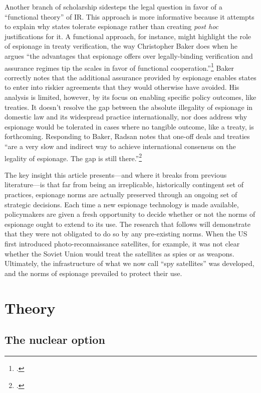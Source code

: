 \documentclass[12pt]{extarticle}
\begin{document}
Another branch of scholarship sidesteps the legal question in favor of a \enquote{functional theory} of IR. This approach is more informative because it attempts to explain why states tolerate espionage rather than creating \emph{post hoc} justifications for it. A functional approach, for instance, might highlight the role of espionage in treaty verification, the way Christopher Baker does when he argues \enquote{the advantages that espionage offers over legally-binding verification and assurance regimes tip the scales in favor of functional cooperation.}\footcite{baker_tolerance_2004} Baker correctly notes that the additional assurance provided by espionage enables states to enter into riskier agreements that they would otherwise have avoided. His analysis is limited, however, by its focus on enabling specific policy outcomes, like treaties. It doesn't resolve the gap between the absolute illegality of espionage in domestic law and its widespread practice internationally, nor does address why espionage would be tolerated in cases where no tangible outcome, like a treaty, is forthcoming. Responding to Baker, Radsan notes that one-off deals and treaties \enquote{are a very slow and indirect way to achieve international consensus on the legality of espionage. The gap is still there.}\footcite[607]{radsan_unresolved_2007}

The key insight this article presents---and where it breaks from previous literature---is that far from being an irreplicable, historically contingent set of practices, espionage norms are actually preserved through an ongoing set of strategic decisions. Each time a new espionage technology is made available, policymakers are given a fresh opportunity to decide whether or not the norms of espionage ought to extend to its use. The research that follows will demonstrate that they were not obligated to do so by any pre-existing norms. When the US first introduced photo-reconnaissance satellites, for example, it was not clear whether the Soviet Union would treat the satellites as spies or as weapons. Ultimately, the infrastructure of what we now call \enquote{spy satellites} was developed, and the norms of espionage prevailed to protect their use.

\section{Theory}
\subsection{The nuclear option}
\end{document}
